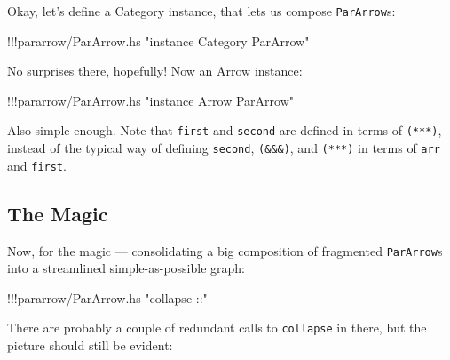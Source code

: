 \documentclass[]{article}
\newenvironment{Shaded}{}{}
\newcommand{\StringTok}[1]{\textcolor[rgb]{0.25,0.44,0.63}{{#1}}}
\newcommand{\FunctionTok}[1]{\textcolor[rgb]{0.02,0.16,0.49}{{#1}}}
\newcommand{\NormalTok}[1]{{#1}}
\begin{document}
Okay, let's define a Category instance, that lets us compose
\texttt{ParArrow}s:

\begin{Shaded}
\begin{Highlighting}[]
\FunctionTok{!!!}\NormalTok{pararrow}\FunctionTok{/}\NormalTok{ParArrow.hs }\StringTok{"instance Category ParArrow"}
\end{Highlighting}
\end{Shaded}

No surprises there, hopefully! Now an Arrow instance:

\begin{Shaded}
\begin{Highlighting}[]
\FunctionTok{!!!}\NormalTok{pararrow}\FunctionTok{/}\NormalTok{ParArrow.hs }\StringTok{"instance Arrow ParArrow"}
\end{Highlighting}
\end{Shaded}

Also simple enough. Note that \texttt{first} and \texttt{second} are
defined in terms of \texttt{(***)}, instead of the typical way of
defining \texttt{second}, \texttt{(\&\&\&)}, and \texttt{(***)} in terms
of \texttt{arr} and \texttt{first}.

\subsection{The Magic}\label{the-magic}

Now, for the magic --- consolidating a big composition of fragmented
\texttt{ParArrow}s into a streamlined simple-as-possible graph:

\begin{Shaded}
\begin{Highlighting}[]
\FunctionTok{!!!}\NormalTok{pararrow}\FunctionTok{/}\NormalTok{ParArrow.hs }\StringTok{"collapse ::"}
\end{Highlighting}
\end{Shaded}

There are probably a couple of redundant calls to \texttt{collapse} in
there, but the picture should still be evident:
\end{document}
